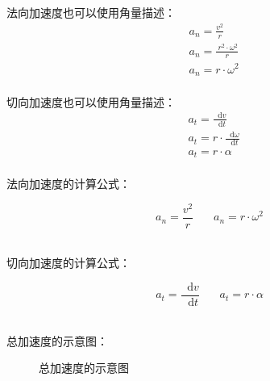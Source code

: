 \documentclass[UTF8]{ctexart}
\newcommand*{\veb}[1]{\vb*{#1}}
\newcommand*{\dif}{\mathop{}\!\mathrm{d}}
\begin{document}
\newpage

    法向加速度也可以使用角量描述：
    \begin{align}
        &a_n=\frac{v^2}{r}\\[3mm]
        &a_n=\frac{~r^2\cdot\omega^2}{r}\\[3mm]
        &a_n=r\cdot\omega^2
    \end{align}\\
    切向加速度也可以使用角量描述：
    \begin{align}
        &a_t=\frac{\dif v}{\dif t}\\[3mm]
        &a_t=r\cdot\frac{\dif \omega}{\dif t}\\[3mm]
        &a_t=r\cdot\alpha
    \end{align}\\
    法向加速度的计算公式：
    \begin{large}
        \begin{equation*}
            a_n=\frac{v^2}{r}~~~~~~~~a_n=r\cdot\omega^2
        \end{equation*}
    \end{large}\\
    切向加速度的计算公式：
    \begin{large}
        \begin{equation*}
            a_t=\frac{\dif v}{\dif t}~~~~~~~~a_t=r\cdot\alpha
        \end{equation*}
    \end{large}\\
    总加速度的示意图：
    \begin{figure}[h]
        \begin{center}
            \caption{总加速度的示意图}
        \end{center}
    \end{figure}\\
\end{document}
